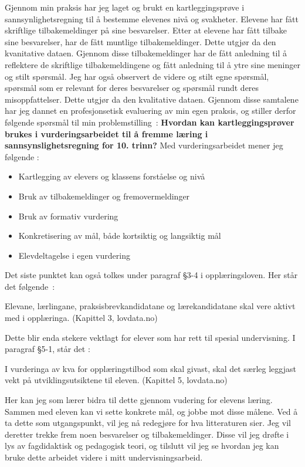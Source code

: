 \documentclass[main.tex]{subfiles}
\begin{document}
Gjennom min praksis har jeg laget og brukt en kartleggingsprøve i sannsynlighetsregning til å bestemme
elevenes nivå og svakheter. Elevene har fått skriftlige tilbakemeldinger på sine besvarelser.
Etter at elevene har fått tilbake sine besvarelser, har de fått muntlige tilbakemeldinger. Dette utgjør da 
den kvanitative dataen. Gjennom disse tilbakemeldinger har de fått anledning til å reflektere
de skriftlige tilbakemeldingene og fått anledning til å ytre sine meninger og stilt spørsmål. Jeg har også
observert de videre og stilt egne spørsmål, spørsmål som er relevant for deres besvarelser og spørsmål
rundt deres misoppfattelser. Dette utgjør da den kvalitative dataen. Gjennom disse samtalene har jeg dannet 
en profesjonsetisk evaluering av min egen praksis, og stiller derfor følgende spørsmål til min 
\mbox{problemstilling :}
\newline
\newline
\textbf{Hvordan kan kartleggingsprøver brukes i vurderingsarbeidet til å fremme læring i 
        sannsynslighetsregning for 10. trinn?}
\newline
\newline
Med vurderingsarbeidet mener jeg følgende :
\begin{itemize}
\item Kartlegging av elevers og klassens forståelse og nivå
\item Bruk av tilbakemeldinger og fremovermeldinger
\item Bruk av formativ vurdering
\item Konkretisering av mål, både kortsiktig og langsiktig mål
\item Elevdeltagelse i egen vurdering
\end{itemize}

Det siste punktet kan også tolkes under paragraf \S 3-4 i opplæringsloven. Her står det \mbox{følgende :}
\begin{displayquote}
Elevane, lærlingane, praksisbrevkandidatane og lærekandidatane skal vere aktivt med i opplæringa.
(Kapittel 3, lovdata.no)
\end{displayquote}
Dette blir enda stekere vektlagt for elever som har rett til spesial undervisning. I paragraf \S 5-1, står det :
\begin{displayquote}
I vurderinga av kva for opplæringstilbod som skal givast, skal det særleg leggjast vekt på utviklingsutsiktene til eleven.
(Kapittel 5, lovdata.no)
\end{displayquote}
Her kan jeg som lærer bidra til dette gjennom vudering for elevens læring. Sammen med eleven kan vi sette konkrete mål,
og jobbe mot disse målene. Ved å ta dette som utgangspunkt, vil jeg nå redegjøre for hva litteraturen sier.
Jeg vil deretter trekke frem noen besvarelser og tilbakemeldinger. Disse vil jeg drøfte i lys av fagdidaktisk og 
pedagogisk teori, og tilslutt vil jeg se hvordan jeg kan bruke dette arbeidet videre i mitt undervisningsarbeid.
\end{document}
